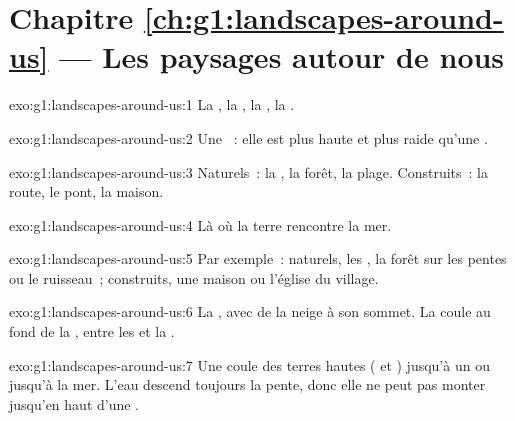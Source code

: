 \section*{Chapitre \ref{ch:g1:landscapes-around-us} --- Les paysages autour de nous}

\begin{solution}{exo:g1:landscapes-around-us:1}
La , la , la , la .
\end{solution}

\begin{solution}{exo:g1:landscapes-around-us:2}
Une ~: elle est plus haute et plus raide qu'une .
\end{solution}

\begin{solution}{exo:g1:landscapes-around-us:3}
Naturels~: la , la forêt, la plage. Construits~: la route, le pont,
la maison.
\end{solution}

\begin{solution}{exo:g1:landscapes-around-us:4}
Là où la terre rencontre la mer.
\end{solution}

\begin{solution}{exo:g1:landscapes-around-us:5}
Par exemple~: naturels, les , la forêt sur les pentes ou le
ruisseau~; construits, une maison ou l'église du village.
\end{solution}

\begin{solution}{exo:g1:landscapes-around-us:6}
La , avec de la neige à son sommet. La  coule au fond de la
, entre les  et la .
\end{solution}

\begin{solution}{exo:g1:landscapes-around-us:7}
Une  coule des terres hautes ( et ) jusqu'à un 
ou jusqu'à la mer. L'eau descend toujours la pente, donc elle ne peut pas
monter jusqu'en haut d'une .
\end{solution}

